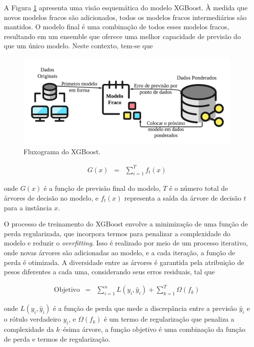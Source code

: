 A Figura \ref{fig:xgboos} apresenta uma visão esquemática do modelo XGBoost. À medida que novos modelos fracos são adicionados, todos os modelos fracos intermediários são mantidos. O modelo final é uma combinação de todos esses modelos fracos, resultando em um ensemble que oferece uma melhor capacidade de previsão do que um único modelo. Neste contexto, tem-se que

\begin{figure}[!htb]
	\centering
	\caption{Fluxograma do XGBoost.}
	\label{fig:xgboos}
	\includegraphics[width=\linewidth]{Modelos/Figuras/xgboos.pdf}
\end{figure}
 

 \begin{eqnarray}
 	 G(x) &=& \sum_{i=1}^{T} f_t(x) \label{eq:xgboost}
 \end{eqnarray}

 
\noindent onde $G(x)$ é a função de previsão final do modelo,  $T$ é o número total de árvores de decisão no modelo, e $f_t(x)$  representa a saída da árvore de decisão $ t $ para a instância $ x $.
 
 O processo de treinamento do XGBoost envolve a minimização de uma função de perda regularizada, que incorpora termos para penalizar a complexidade do modelo e reduzir o \textit{overfitting}. Isso é realizado por meio de um processo iterativo, onde novas árvores são adicionadas ao modelo, e a cada iteração, a função de perda é otimizada. A diversidade entre as árvores é garantida pela atribuição de pesos diferentes a cada uma, considerando seus erros residuais, tal que
 

\begin{eqnarray}
	 \text{Objetivo} &=& \sum_{i=1}^{n} L(y_i, \hat{y}_i) + \sum_{k=1}^{T} \Omega(f_k) \label{eq:xgboost1}
\end{eqnarray}

 
\noindent onde $ L(y_i, \hat{y}_i) $ é a função de perda que mede a discrepância entre a previsão $ \hat{y}_i $ e o rótulo verdadeiro $ y_i $, e $ \Omega(f_k) $ é um termo de regularização que penaliza a complexidade da $ k $--ésima árvore, a função objetivo é uma combinação da função de perda e termos de regularização.
 
